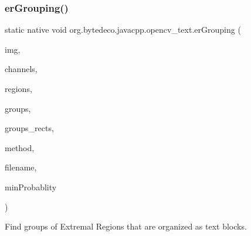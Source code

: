\subsubsection{\texorpdfstring{er\+Grouping()}{erGrouping()}}
{\footnotesize\ttfamily static native void org.\+bytedeco.\+javacpp.\+opencv\+\_\+text.\+er\+Grouping (\begin{DoxyParamCaption}\item[{@By\+Val Mat}]{img,  }\item[{@By\+Val Mat\+Vector}]{channels,  }\item[{@By\+Ref E\+R\+Stat\+Vector\+Vector}]{regions,  }\item[{@Cast(\char`\"{}std\+::vector$<$std\+::vector$<$cv\+::\+Vec2i$>$ $>$$\ast$\char`\"{}) @By\+Ref Point\+Vector\+Vector}]{groups,  }\item[{@By\+Ref Rect\+Vector}]{groups\+\_\+rects,  }\item[{int}]{method,  }\item[{@Std\+String Byte\+Pointer}]{filename,  }\item[{float}]{min\+Probablity }\end{DoxyParamCaption})\hspace{0.3cm}{\ttfamily [static]}}



Find groups of Extremal Regions that are organized as text blocks. 


